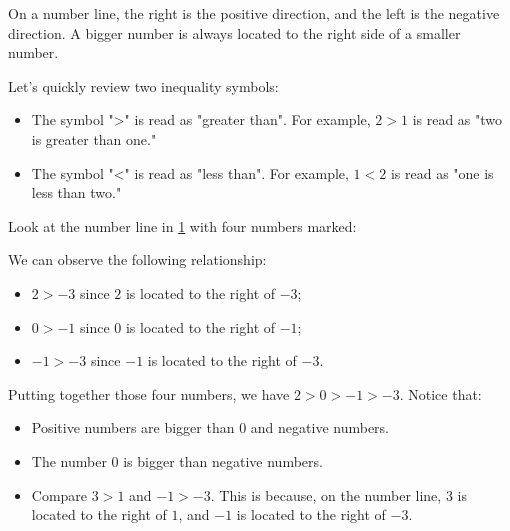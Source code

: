 On a number line, the right is the positive direction, and the left is the negative direction. A bigger number is always located to the right side of a smaller number. 

Let's quickly review two inequality symbols:
\begin{itemize}
\item The symbol ">" is read as "greater than". For example, $2>1$ is read as "two is greater than one."
\item The symbol "<" is read as "less than". For example, $1<2$ is read as "one is less than two."
\end{itemize}

Look at the number line in \cref{fig:NumberLine2} with four numbers marked:

\begin{figure}[!htb]
\centering
	\label{fig:NumberLine2}
\end{figure}

We can observe the following relationship:
\begin{itemize}
\item $2>-3$ since $2$ is located to the right of $-3$;
\item $0>-1$ since $0$ is located to the right of $-1$;
\item $-1>-3$ since $-1$ is located to the right of $-3$.
\end{itemize}

Putting together those four numbers, we have $2>0>-1>-3$. Notice that:
\begin{itemize}
\item Positive numbers are bigger than 0 and negative numbers.
\item The number 0 is bigger than negative numbers.
\item Compare $3>1$ and $-1>-3$. This is because, on the number line, $3$ is located to the right of $1$, and $-1$ is located to the right of $-3$.
\end{itemize}

